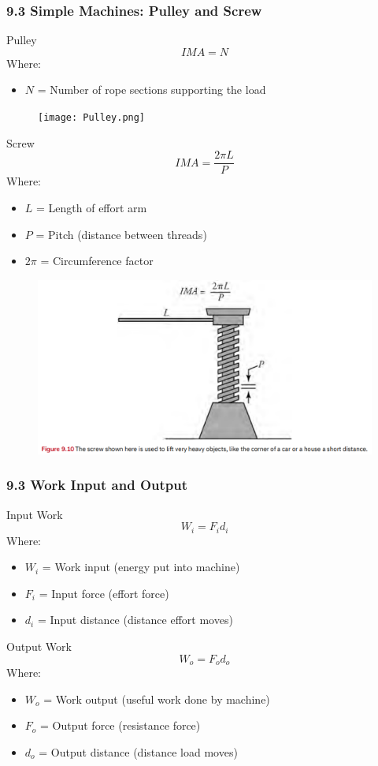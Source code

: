 \documentclass{beamer}
\begin{document}
\begin{frame}
\frametitle{9.3 Simple Machines: Pulley and Screw}
\begin{block}{Pulley}
$$IMA = N$$
Where:
\begin{itemize}
\item $N$ = Number of rope sections supporting the load
\end{itemize}
\end{block}
\begin{figure}
    \centering
    \texttt{[image: Pulley.png]}
\end{figure}
\end{frame}

\begin{frame}
\begin{block}{Screw}
$$IMA = \frac{2\pi L}{P}$$
Where:
\begin{itemize}
\item $L$ = Length of effort arm
\item $P$ = Pitch (distance between threads)
\item $2\pi$ = Circumference factor
\end{itemize}
\end{block}
\begin{figure}
    \centering
    \includegraphics[width=0.5\linewidth]{Screw.png}
\end{figure}
\end{frame}

\begin{frame}
\frametitle{9.3 Work Input and Output}
\begin{block}{Input Work}
$$W_i = F_id_i$$
Where:
\begin{itemize}
\item $W_i$ = Work input (energy put into machine)
\item $F_i$ = Input force (effort force)
\item $d_i$ = Input distance (distance effort moves)
\end{itemize}
\end{block}

\begin{block}{Output Work}
$$W_o = F_od_o$$
Where:
\begin{itemize}
\item $W_o$ = Work output (useful work done by machine)
\item $F_o$ = Output force (resistance force)
\item $d_o$ = Output distance (distance load moves)
\end{itemize}
\end{block}
\end{frame}
\end{document}
